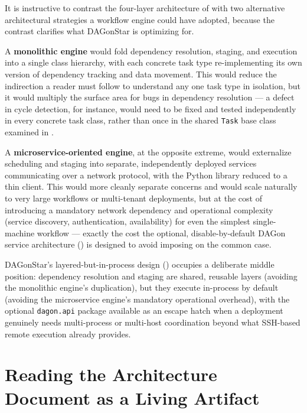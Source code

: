 It is instructive to contrast the four-layer architecture of
 with two alternative architectural strategies
a workflow engine could have adopted, because the contrast clarifies what
DAGonStar is optimizing for.

A \textbf{monolithic engine} would fold dependency resolution, staging, and
execution into a single class hierarchy, with each concrete task type
re-implementing its own version of dependency tracking and data movement.
This would reduce the indirection a reader must follow to understand any one
task type in isolation, but it would multiply the surface area for bugs in
dependency resolution --- a defect in cycle detection, for instance, would
need to be fixed and tested independently in every concrete task class,
rather than once in the shared \texttt{Task} base class examined in
.

A \textbf{microservice-oriented engine}, at the opposite extreme, would
externalize scheduling and staging into separate, independently deployed
services communicating over a network protocol, with the Python library
reduced to a thin client. This would more cleanly separate concerns and
would scale naturally to very large workflows or multi-tenant deployments,
but at the cost of introducing a mandatory network dependency and
operational complexity (service discovery, authentication, availability)
for even the simplest single-machine workflow --- exactly the cost the
optional, disable-by-default DAGon service architecture
() is designed to avoid imposing on the
common case.

\begin{practicebox}
DAGonStar's layered-but-in-process design ()
occupies a deliberate middle position: dependency resolution and staging are
shared, reusable layers (avoiding the monolithic engine's duplication), but
they execute in-process by default (avoiding the microservice engine's
mandatory operational overhead), with the optional \texttt{dagon.api}
package available as an escape hatch when a deployment genuinely needs
multi-process or multi-host coordination beyond what SSH-based remote
execution already provides.
\end{practicebox}

\section{Reading the Architecture Document as a Living Artifact}

